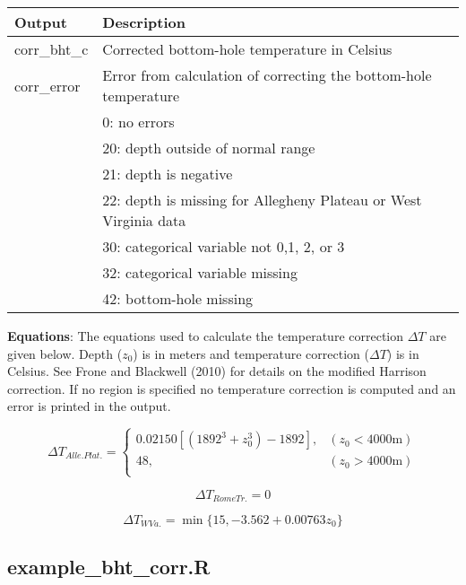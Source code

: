 \documentclass[12pt,a4paper]{article}
\begin{document}
\begin{table}[H]
\begin{tabular} {p{2cm} p{11cm}}
\hline
\textbf{Output} & \textbf{Description}\\
\hline
\textsf{corr\_bht\_c} 	 & Corrected bottom-hole temperature in Celsius \\
\textsf{corr\_error}		 & Error from calculation of correcting the bottom-hole temperature\\
  & 0: no errors\\
  & 20: depth outside of normal range\\
  & 21: depth is negative\\
  & 22: depth is missing for Allegheny Plateau or West Virginia data\\
  & 30: categorical variable not 0,1, 2, or 3\\
  & 32: categorical variable missing\\
  & 42: bottom-hole missing\\
\hline
\end{tabular} 
\end{table}

\textbf{Equations}: The equations used to calculate the temperature correction $\Delta T$ are given below. Depth ($z_0$) is in meters and temperature correction ($\Delta T$) is in Celsius. See Frone and Blackwell (2010) for details on the modified Harrison correction. If no region is specified no temperature correction is computed and an error is printed in the output.

\begin{equation} \label{DT_ap}
{\Delta T}_{Alle. Plat.} =  \left\{
\begin{array}{ll}
0.02150\left[ \left(1892^3 + z_0^3\right) - 1892 \right],	& (z_0 < 4000 \mathrm{m})\\
48,  & (z_0 > 4000 \mathrm{m})\\
\end{array} \right .
\end{equation}

\begin{equation} \label{DT_rt}
{\Delta T}_{Rome Tr.} = 0
\end{equation}

\begin{equation} \label{DT_wv}
{\Delta T}_{W Va.} = \min\{15, -3.562+0.00763z_0 \}
\end{equation}

\subsection*{\textsf{example\_bht\_corr.R}}
\end{document}
